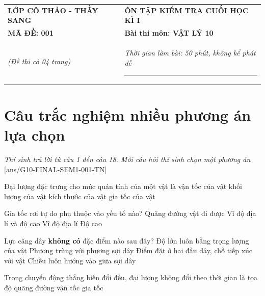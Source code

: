 \begin{center}
	\begin{tabular}{M{9.25cm}M{8.75cm}}
		\textbf{LỚP CÔ THẢO - THẦY SANG}& \textbf{ÔN TẬP KIỂM TRA CUỐI HỌC KÌ I}\\
		\textbf{MÃ ĐỀ: 001}& \textbf{Bài thi môn: VẬT LÝ 10}\\
		\textit{(Đề thi có 04 trang)}& \textit{Thời gian làm bài: 50 phút, không kể phát đề}
		
		\noindent\rule{4cm}{0.8pt} \\
	\end{tabular}
\end{center}
\setcounter{section}{0}
\section{Câu trắc nghiệm nhiều phương án lựa chọn}
\textit{Thí sinh trả lời từ câu 1 đến câu 18. Mỗi câu hỏi thí sinh chọn một phương án}
\setcounter{ex}{0}
[ans/G10-FINAL-SEM1-001-TN]

\begin{ex}
	Đại lượng đặc trưng cho mức quán tính của một vật là
	\choice
	{vận tốc của vật}
	{\True khối lượng của vật}
	{kích thước của vật}
	{gia tốc của vật}
	\loigiai{}
\end{ex}
\begin{ex}
	Gia tốc rơi tự do phụ thuộc vào yếu tố nào?
	\choice
	{Quãng đường vật đi được}
	{\True Vĩ độ địa lí và độ cao}
	{Vĩ độ địa lí}
	{Độ cao}
	\loigiai{}
\end{ex}
\begin{ex}
	Lực căng dây \textbf{không có} đặc điểm nào sau đây?
	\choice
	{\True Độ lớn luôn bằng trọng lượng của vật}
	{Phương trùng với phương sợi dây}
	{Điểm đặt ở hai đầu dây, chỗ tiếp xúc với vật}
	{Chiều luôn hướng vào giữa sợi dây}
	\loigiai{}
\end{ex}
\begin{ex}
	Trong chuyển động thẳng biến đổi đều, đại lượng không đổi theo thời gian là
	\choice
	{tọa độ}
	{quãng đường}
	{vận tốc}
	{\True gia tốc}
	\loigiai{}
\end{ex}

